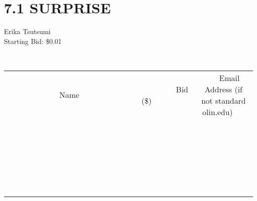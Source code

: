 \documentclass[11pt]{article}
\begin{document}
\section*{7.1 SURPRISE}
Erika Tsutsumi
\\
Starting Bid: \$0.01
\newline

\\[6ex]
\begin{tabular}{c c c}
~~~~~~~~~~~~~Name~~~~~~~~~~~~~ & ~~~~~~~~~Bid (\$)~~~~~~~~~  & ~~~Email Address (if not standard olin.edu)~~~\\
 & & \\
\hline
 & & \\
\hline
 & & \\
\hline
 & & \\
\hline
 & & \\
\hline
 & & \\
\hline
 & & \\
\hline
 & & \\
\hline
 & & \\
\hline
 & & \\
\hline
 & & \\
\hline
 & & \\
\hline
 & & \\
\hline
 & & \\
\hline
 & & \\
\hline
 & & \\
\hline
 & & \\
\hline
 & & \\
\hline
 & & \\
\hline
 & & \\
\hline
 & & \\
\hline
 & & \\
\hline
 & & \\
\hline
 & & \\
\hline
 & & \\
\hline
 & & \\
\hline
\end{tabular}
\newpage
\end{document}
